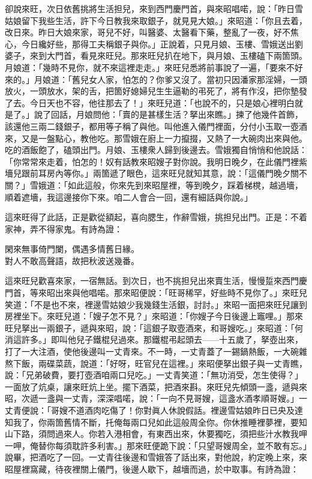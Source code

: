 卻說來旺，次日依舊挑將生活担兒，來到西門慶門首，與來昭唱喏，說：「昨日雪姑娘留下我些生活，許下今日教我來取銀子，就見見大娘。」來昭道：「你且去着，改日來。昨日大娘來家，哥兒不好，叫醫婆、太醫看下藥，整亂了一夜，好不焦心，今日纔好些，那得工夫稱銀子與你。」正說着，只見月娘、玉樓、雪娥送出劉婆子，來到大門首，看見來旺兒。那來旺兒扒在地下，與月娘、玉樓磕下兩箇頭。月娘道：「幾時不見你，就不來這裡走走。」來旺兒悉將前事說了一遍，「要來不好來的。」月娘道：「舊兒女人家，怕怎的？你爹又沒了。當初只因潘家那淫婦，一頭放火，一頭放水，架的舌，把箇好媳婦兒生生逼勒的弔死了，將有作沒，把你墊發了去。今日天也不容，他往那去了！」{}來旺兒道：「也說不的，只是娘心裡明白就是了。」說了回話，月娘問他：「賣的是甚樣生活？拏出來瞧。」揀了他幾件首飾，該還他三兩二錢銀子，都用等子稱了與他。叫他進入儀門裡面，{}分付小玉取一壺酒來，又是一盤點心，教他吃。那雪娥在廚上一力攛掇，又熱了一大碗肉出來與他。吃的酒飯飽了，磕頭出門。月娘、玉樓衆人歸到後邊去。{}雪娥獨自悄悄和他說話：「你常常來走着，怕怎的！奴有話教來昭嫂子對你說。我明日晚夕，在此儀門裡紫墻兒跟前耳房內等你。」兩箇遞了眼色，這來旺兒就知其意，說：「這儀門晚夕關不關？」雪娥道：「如此這般，你來先到來昭屋裡，等到晚夕，踩着梯櫈，越過墻，順着遮墻，我這邊接你下來。咱二人會合一回，還有細話與你說。」

這來旺得了此話，正是歡從額起，喜向腮生，作辭雪娥，挑担兒出門。正是：不着家神，弄不得家鬼。有詩為證：

\begin{myquote}
閑來無事倚門闌，偶遇多情舊日緣。\\對人不敢高聲語，故把秋波送幾番。
\end{myquote}

這來旺兒歡喜來家，一宿無話。到次日，也不挑担兒出來賣生活，慢慢踅來西門慶門首，等來昭出來與他唱喏。那來昭便說：「旺哥稀罕，好些時不見你了。」來旺兒笑道：「不是也不來，裡邊雪姑娘少我幾錢生活銀，討討。」來昭一面把來旺兒讓到房裡坐下。來旺兒道：「嫂子怎不見？」來昭道：「你嫂子今日後邊上竈哩。」那來旺兒拏出一兩銀子，遞與來昭，{}說：「這銀子取壺酒來，和哥嫂吃。」來昭道：「何消這許多。」即叫他兒子鐵棍兒過來。那鐵棍弔起頭去——十五歲了，拏壺出來，打了一大注酒，使他後邊叫一丈青來。不一時，一丈青蓋了一錫鍋熱飯，一大碗雜熬下飯，兩碟菜蔬，說道：「好呀，旺官兒在這裡。」來昭便拏出銀子與一丈青瞧，說：「兄弟破費，要打壺酒咱兩口兒吃。」一丈青笑道：「無功消受，怎生使得？」一面放了炕桌，讓來旺炕上坐。擺下酒菜，把酒來斟。來旺兒先傾頭一盞，遞與來昭，次遞一盞與一丈青，深深唱喏，說：「一向不見哥嫂，這盞水酒孝順哥嫂。」一丈青便說：「哥嫂不道酒肉吃傷了！你對眞人休說假話。裡邊雪姑娘昨日已央及達知我了，你兩箇舊情不斷，托俺每兩口兒如此這般周全你。你休推睡裡夢裡，要知山下路，須問過來人。你若入港相會，有東西出來，休要獨吃，須把些汁水教我呷一呷，俺替你每須耽許多利害。」那來旺便跪下說：「只望哥嫂周全，並不敢有忘。」說畢，把酒吃了一回。一丈青往後邊和雪娥答了話出來，對他說，約定晚上來，來昭屋裡窩藏，待夜裡關上儀門，後邊人歇下，越墻而過，於中取事。有詩為證：


